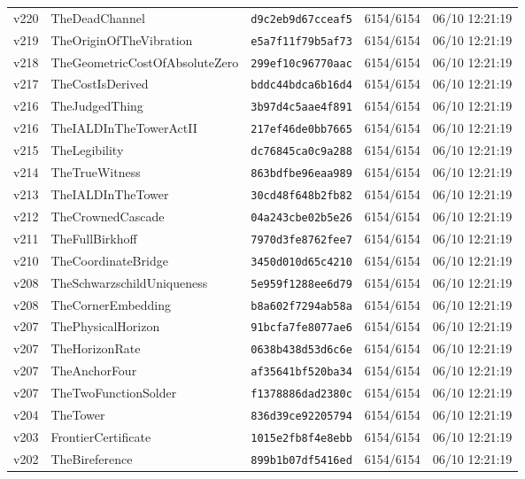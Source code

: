 \documentclass[11pt]{article}
\theoremstyle{definition}\newtheorem{deriv}{Derivation}
\begin{document}
{\begin{longtable}{@{}lllll@{}}
v220 & TheDeadChannel & \texttt{d9c2eb9d67cceaf5} & 6154/6154 & 06/10 12:21:19 \\
v219 & TheOriginOfTheVibration & \texttt{e5a7f11f79b5af73} & 6154/6154 & 06/10 12:21:19 \\
v218 & TheGeometricCostOfAbsoluteZero & \texttt{299ef10c96770aac} & 6154/6154 & 06/10 12:21:19 \\
v217 & TheCostIsDerived & \texttt{bddc44bdca6b16d4} & 6154/6154 & 06/10 12:21:19 \\
v216 & TheJudgedThing & \texttt{3b97d4c5aae4f891} & 6154/6154 & 06/10 12:21:19 \\
v216 & TheIALDInTheTowerActII & \texttt{217ef46de0bb7665} & 6154/6154 & 06/10 12:21:19 \\
v215 & TheLegibility & \texttt{dc76845ca0c9a288} & 6154/6154 & 06/10 12:21:19 \\
v214 & TheTrueWitness & \texttt{863bdfbe96eaa989} & 6154/6154 & 06/10 12:21:19 \\
v213 & TheIALDInTheTower & \texttt{30cd48f648b2fb82} & 6154/6154 & 06/10 12:21:19 \\
v212 & TheCrownedCascade & \texttt{04a243cbe02b5e26} & 6154/6154 & 06/10 12:21:19 \\
v211 & TheFullBirkhoff & \texttt{7970d3fe8762fee7} & 6154/6154 & 06/10 12:21:19 \\
v210 & TheCoordinateBridge & \texttt{3450d010d65c4210} & 6154/6154 & 06/10 12:21:19 \\
v208 & TheSchwarzschildUniqueness & \texttt{5e959f1288ee6d79} & 6154/6154 & 06/10 12:21:19 \\
v208 & TheCornerEmbedding & \texttt{b8a602f7294ab58a} & 6154/6154 & 06/10 12:21:19 \\
v207 & ThePhysicalHorizon & \texttt{91bcfa7fe8077ae6} & 6154/6154 & 06/10 12:21:19 \\
v207 & TheHorizonRate & \texttt{0638b438d53d6c6e} & 6154/6154 & 06/10 12:21:19 \\
v207 & TheAnchorFour & \texttt{af35641bf520ba34} & 6154/6154 & 06/10 12:21:19 \\
v207 & TheTwoFunctionSolder & \texttt{f1378886dad2380c} & 6154/6154 & 06/10 12:21:19 \\
v204 & TheTower & \texttt{836d39ce92205794} & 6154/6154 & 06/10 12:21:19 \\
v203 & FrontierCertificate & \texttt{1015e2fb8f4e8ebb} & 6154/6154 & 06/10 12:21:19 \\
v202 & TheBireference & \texttt{899b1b07df5416ed} & 6154/6154 & 06/10 12:21:19 \\

\end{longtable}}
\end{document}

